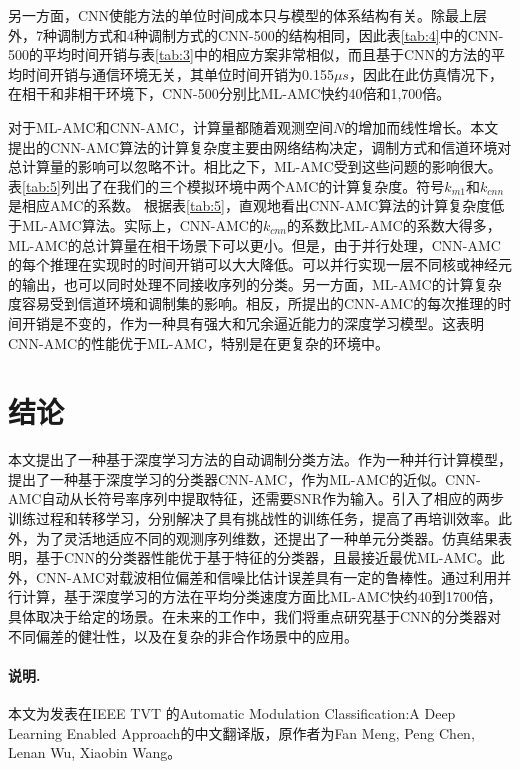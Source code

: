 \documentclass[final]{cvpr}
\begin{document}
\begin{itemize}
 另一方面，CNN使能方法的单位时间成本只与模型的体系结构有关。除最上层外，7种调制方式和4种调制方式的CNN-500的结构相同，因此表\ref{tab:4}中的CNN-500的平均时间开销与表\ref{tab:3}中的相应方案非常相似，而且基于CNN的方法的平均时间开销与通信环境无关，其单位时间开销为0.155$\mu s$，因此在此仿真情况下，在相干和非相干环境下，CNN-500分别比ML-AMC快约40倍和1,700倍。

 对于ML-AMC和CNN-AMC，计算量都随着观测空间$N$的增加而线性增长。本文提出的CNN-AMC算法的计算复杂度主要由网络结构决定，调制方式和信道环境对总计算量的影响可以忽略不计。相比之下，ML-AMC受到这些问题的影响很大。表\ref{tab:5}列出了在我们的三个模拟环境中两个AMC的计算复杂度。符号$k_{m1}$和$k_{cnn}$是相应AMC的系数。
根据表\ref{tab:5}，直观地看出CNN-AMC算法的计算复杂度低于ML-AMC算法。实际上，CNN-AMC的$k_{cnn}$的系数比ML-AMC的系数大得多，ML-AMC的总计算量在相干场景下可以更小。但是，由于并行处理，CNN-AMC的每个推理在实现时的时间开销可以大大降低。可以并行实现一层不同核或神经元的输出，也可以同时处理不同接收序列的分类。另一方面，ML-AMC的计算复杂度容易受到信道环境和调制集的影响。相反，所提出的CNN-AMC的每次推理的时间开销是不变的，作为一种具有强大和冗余逼近能力的深度学习模型。这表明CNN-AMC的性能优于ML-AMC，特别是在更复杂的环境中。
\end{itemize}

\section{结论}\label{conclusion}

本文提出了一种基于深度学习方法的自动调制分类方法。作为一种并行计算模型，提出了一种基于深度学习的分类器CNN-AMC，作为ML-AMC的近似。CNN-AMC自动从长符号率序列中提取特征，还需要SNR作为输入。引入了相应的两步训练过程和转移学习，分别解决了具有挑战性的训练任务，提高了再培训效率。此外，为了灵活地适应不同的观测序列维数，还提出了一种单元分类器。仿真结果表明，基于CNN的分类器性能优于基于特征的分类器，且最接近最优ML-AMC。此外，CNN-AMC对载波相位偏差和信噪比估计误差具有一定的鲁棒性。通过利用并行计算，基于深度学习的方法在平均分类速度方面比ML-AMC快约40到1700倍，具体取决于给定的场景。在未来的工作中，我们将重点研究基于CNN的分类器对不同偏差的健壮性，以及在复杂的非合作场景中的应用。
\paragraph{说明.} 本文为发表在IEEE TVT 的Automatic Modulation Classification:A Deep Learning Enabled Approach的中文翻译版，原作者为Fan Meng, Peng Chen, Lenan Wu, Xiaobin Wang。

{\small
 


}

\end{document}
